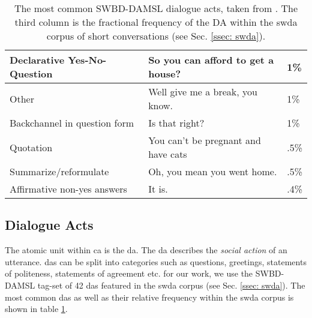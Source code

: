 \begin{table}[h]
\begin{tabular}{|l|l|l|}
            Declarative Yes-No-Question  & So you can afford to get a house?               & 1\%         \\ \hline
            Other                        & Well give me a break, you know.                 & 1\%         \\ \hline
            Backchannel in question form & Is that right?                                  & 1\%         \\ \hline
            Quotation                    & You can't be pregnant and have cats             & .5\%        \\ \hline
            Summarize/reformulate        & Oh, you mean you went home.                     & .5\%        \\ \hline
            Affirmative non-yes answers  & It is.                                          & .4\%        \\ \hline
        \end{tabular}
        \caption{The most common SWBD-DAMSL dialogue acts, taken from \cite{swda}. The third column is the fractional frequency of the DA within the \gls{swda} corpus of short conversations (see Sec. \ref{ssec: swda}).}
        \label{table: damsl das}
        \end{table} 
        
    \subsection{Dialogue Acts \label{ssec: DAs}}
        The atomic unit within \gls{ca} is the \gls{da}. The \gls{da} describes the \textit{social action} of an \gls{utterance}. \Glspl{da} can be split into categories such as questions, greetings, statements of politeness, statements of agreement etc. for our work, we use the SWBD-DAMSL tag-set of 42 \glspl{da} featured in the \gls{swda} corpus (see Sec. \ref{ssec: swda})\cite{fang2012annotation, swda}. The most common \glspl{da} as well as their relative frequency within the \gls{swda} corpus is shown in table \ref{table: damsl das}. \newline
        

    
        

